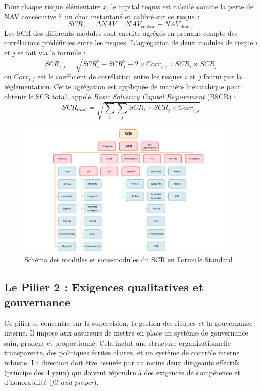 Pour chaque risque élémentaire $x$, le capital requis est calculé comme la perte de NAV consécutive à un choc instantané et calibré sur ce risque :
\begin{equation}
    SCR_{x} = \Delta NAV = NAV_{\text{central}} - NAV_{\text{choc } x}
\end{equation}
Les SCR des différents modules sont ensuite agrégés en prenant compte des corrélations prédéfinies entre les risques. L'agrégation de deux modules de risque $i$ et $j$ se fait via la formule :
\begin{equation}
    SCR_{i,j} = \sqrt{SCR_i^2 + SCR_j^2 + 2 \times Corr_{i,j} \times SCR_i \times SCR_j}
\end{equation}
où $Corr_{i,j}$ est le coefficient de corrélation entre les risques $i$ et $j$ fourni par la réglementation. Cette agrégation est appliquée de manière hiérarchique pour obtenir le SCR total, appelé \textit{Basic Solvency Capital Requirement} (BSCR) :
\begin{equation}
    SCR_{total} = \sqrt{\sum_{i}\sum_{j} SCR_i \times SCR_j \times Corr_{i,j}}
\end{equation}

\begin{figure}[H]
    \centering
    \includegraphics[width=0.95\textwidth]{images/2_chapitres/chapitre1/pieuvre_scr.png}
    \caption{Schéma des modules et sous-modules du SCR en Formule Standard}
    \label{fig:pieuvre_scr}
\end{figure}

\subsection{Le Pilier 2 : Exigences qualitatives et gouvernance}

Ce pilier se concentre sur la supervision, la gestion des risques et la gouvernance interne. Il impose aux assureurs de mettre en place un système de gouvernance sain, prudent et proportionné. Cela inclut une structure organisationnelle transparente, des politiques écrites claires, et un système de contrôle interne robuste. La direction doit être assurée par au moins deux dirigeants effectifs (principe des 4 yeux) qui doivent répondre à des exigences de compétence et d'honorabilité (\textit{fit and proper}).

